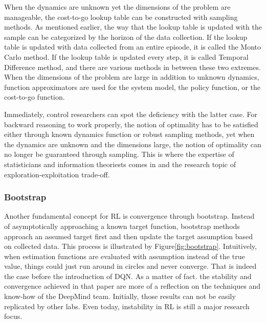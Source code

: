 \documentclass[journal]{IEEEtran}
\begin{document}
When the dynamics are unknown yet the dimensions of the problem are manageable, the cost-to-go lookup table can be constructed with sampling methods. As mentioned earlier, the way that the lookup table is updated with the sample can be categorized by the horizon of the data collection. If the lookup table is updated with data collected from an entire episode, it is called the Monto Carlo method. If the lookup table is updated every step, it is called Temporal Difference method, and there are various methods in between these two extremes. When the dimensions of the problem are large in addition to unknown dynamics, function approximators are used for the system model, the policy function, or the cost-to-go function. 

Immediately, control researchers can spot the deficiency with the latter case. For backward reasoning to work properly, the notion of optimality has to be satisfied either through known dynamics function or robust sampling methods, yet when the dynamics are unknown and the dimensions large, the notion of optimality can no longer be guaranteed through sampling. This is where the expertise of statisticians and information theoriests comes in and the research topic of exploration-exploitation trade-off.

\subsubsection{Bootstrap}

Another fundamental concept for RL is convergence through bootstrap. Instead of asymptotically approaching a known target function, bootstrap methods approach an assumed target first and then update the target assumption based on collected data. This process is illustrated by Figure\ref{fig:bootstrap}. Intuitively, when estimation functions are evaluated with assumption instead of the true value, things could just run around in circles and never converge. That is indeed the case before the introduction of DQN\cite{Osband2016DeepEV}. As a matter of fact. the stability and convergence achieved in that paper are more of a reflection on the techniques and know-how of the DeepMind team. Initially, those results can not be easily replicated by other labs. Even today, instability in RL is still a major research focus. 
\end{document}
